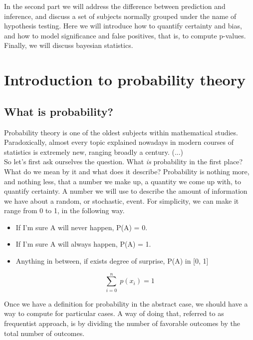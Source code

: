 \documentclass{book}
\begin{document}
In the second part we will address the difference between prediction and inference, and discuss a set of subjects normally grouped under the name of hypothesis testing. Here we will introduce how to quantify certainty and bias, and how to model significance and false positives, that is, to compute p-values.\\

Finally, we will discuss bayesian statistics.

\chapter{Introduction to probability theory}

\section{What is probability?}
Probability theory is one of the oldest subjects within mathematical studies. Paradoxically, almost every topic explained nowadays in modern courses of statistics is extremely new, ranging broadly a century. (...)\\

So let's first ask ourselves the question. What \textit{is} probability in the first place? What do we mean by it and what does it describe? Probability is nothing more, and nothing less, that a number we make up, a quantity we come up with, to quantify certainty. A number we will use to describe the amount of information we have about a random, or stochastic, event. For simplicity, we can make it range from 0 to 1, in the following way.

\begin{itemize}
\item If I'm sure A will never happen, P(A) = 0.
\item If I'm sure A will always happen,  P(A) = 1.
\item Anything in between, if exists degree of surprise, P(A) in [0, 1]
\end{itemize}

\begin{equation}
	\sum_{i = 0}^{n} \; p(x_{i}) = 1
\end{equation}

Once we have a definition for probability in the abstract case, we should have a way to compute for particular cases. A way of doing that, referred to as frequentist approach, is by dividing the number of favorable outcomes by the total number of outcomes.
\end{document}
